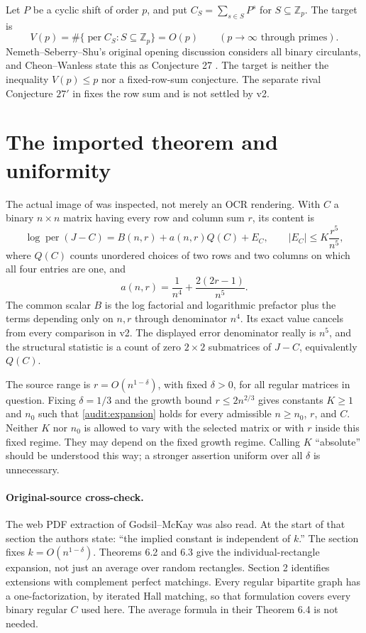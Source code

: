 \documentclass[11pt,a4paper]{article}
\newcommand{\per}{\operatorname{per}}
\begin{document}
Let $P$ be a cyclic shift of order $p$, and put $C_S=\sum_{s\in S}P^s$ for $S\subseteq\mathbb Z_p$. The target is
\[
 V(p)=\#\{\per C_S:S\subseteq\mathbb Z_p\}=O(p)
 \qquad(p\longrightarrow\infty\text{ through primes}).
\]
Nemeth--Seberry--Shu's original opening discussion considers all binary circulants, and Cheon--Wanless state this as Conjecture 27 \cite{audit:NSS,audit:CW}. The target is neither the inequality $V(p)\le p$ nor a fixed-row-sum conjecture. The separate rival Conjecture $27'$ in \cite{audit:CW} fixes the row sum and is not settled by v2.

\section{The imported theorem and uniformity}
The actual image of \cite[p.~321, Eq.~(5)]{audit:CW} was inspected, not merely an OCR rendering. With $C$ a binary $n\times n$ matrix having every row and column sum $r$, its content is
\begin{equation}\label{audit:expansion}
 \log\per(J-C)=B(n,r)+a(n,r)Q(C)+E_C,
 \qquad |E_C|\le K\frac{r^5}{n^5},
\end{equation}
where $Q(C)$ counts unordered choices of two rows and two columns on which all four entries are one, and
\[
 a(n,r)=\frac1{n^4}+\frac{2(2r-1)}{n^5}.
\]
The common scalar $B$ is the log factorial and logarithmic prefactor plus the terms depending only on $n,r$ through denominator $n^4$. Its exact value cancels from every comparison in v2. The displayed error denominator really is $n^5$, and the structural statistic is a count of zero $2\times2$ submatrices of $J-C$, equivalently $Q(C)$.

The source range is $r=O(n^{1-\delta})$, with fixed $\delta>0$, for all regular matrices in question. Fixing $\delta=1/3$ and the growth bound $r\le2n^{2/3}$ gives constants $K\ge1$ and $n_0$ such that \eqref{audit:expansion} holds for every admissible $n\ge n_0$, $r$, and $C$. Neither $K$ nor $n_0$ is allowed to vary with the selected matrix or with $r$ inside this fixed regime. They may depend on the fixed growth regime. Calling $K$ ``absolute'' should be understood this way; a stronger assertion uniform over all $\delta$ is unnecessary.

\paragraph{Original-source cross-check.}
The web PDF extraction of Godsil--McKay \cite[\S6, pp.~36--39]{audit:GM} was also read. At the start of that section the authors state: ``the implied constant is independent of $k$.'' The section fixes $k=O(n^{1-\delta})$. Theorems 6.2 and 6.3 give the individual-rectangle expansion, not just an average over random rectangles. Section 2 identifies extensions with complement perfect matchings. Every regular bipartite graph has a one-factorization, by iterated Hall matching, so that formulation covers every binary regular $C$ used here. The average formula in their Theorem 6.4 is not needed.
\end{document}
